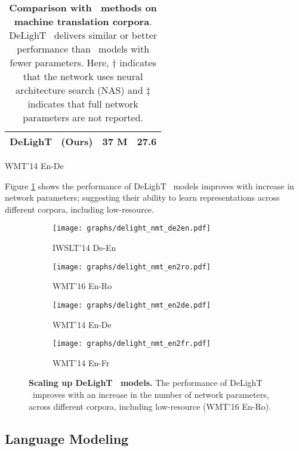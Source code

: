 \begin{table}[t!]
\begin{subtable}[b]{0.47\columnwidth}
{\begin{tabular}{lrr}
            DeLighT ~(Ours) & \textbf{37 M} & \textbf{27.6} \\
            \bottomrule[1.5pt]
        \end{tabular}
        }
        \caption{WMT'14 En-De}
    \end{subtable}
    \caption{\textbf{Comparison with \sota~methods on machine translation corpora}. DeLighT ~delivers similar or better performance than \sota~models with fewer parameters. Here, $\dagger$ indicates that the network uses neural architecture search (NAS) and $\ddagger$ indicates that full network parameters are not reported. }
    \label{tab:comapre_nmt_sota}
\end{table}

 Figure \ref{fig:nmt_perf_curve} shows the performance of DeLighT ~models improves with increase in network parameters; suggesting their ability to learn representations across different corpora, including low-resource.

\begin{figure}[t!]
    \centering
    \begin{subfigure}[b]{0.24\columnwidth}
        \centering
        \texttt{[image: graphs/delight\_nmt\_de2en.pdf]}
        \caption{IWSLT'14 De-En}
    \end{subfigure}
    \hfill
    \begin{subfigure}[b]{0.24\columnwidth}
        \centering
        \texttt{[image: graphs/delight\_nmt\_en2ro.pdf]}
        \caption{WMT'16 En-Ro}
    \end{subfigure}
    \hfill
    \begin{subfigure}[b]{0.24\columnwidth}
        \centering
        \texttt{[image: graphs/delight\_nmt\_en2de.pdf]}
        \caption{WMT'14 En-De}
    \end{subfigure}
    \hfill
    \begin{subfigure}[b]{0.24\columnwidth}
        \centering
        \texttt{[image: graphs/delight\_nmt\_en2fr.pdf]}
        \caption{WMT'14 En-Fr}
    \end{subfigure}
    \caption{\textbf{Scaling up DeLighT ~models.} The performance of DeLighT ~improves with an increase in the number of network parameters, across different corpora, including low-resource (WMT'16 En-Ro).}
    \label{fig:nmt_perf_curve}
\end{figure}

\subsection{Language Modeling}
\label{ssec:language_mdoeling}

